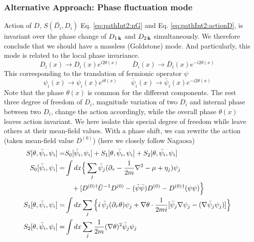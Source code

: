 \subsubsection{Alternative Approach: Phase fluctuation mode \label{sec:phaseFluctuation}}
 Action of $D$, $S(\bar{D_i},D_i)$ Eq. \eqref{eq:pathInt2:nG} and Eq. \eqref{eq:pathInt2:actionD}, is invariant over the phase change of $D_{1\,\mathbf{k}}$ and $D_{2\,\mathbf{k}}$ simultaneously. We therefore conclude that we should have a massless (Goldstone) mode.  And particularly, this mode is related to the local phase invariance. 
\begin{equation*}
D_{i}(x)\rightarrow{}D_{i}(x)e^{i2\theta(x)}\qquad{}
\bar{D}_{i}(x)\rightarrow{}\bar{D}_{i}(x)e^{-i2\theta(x)}
\end{equation*}
This corresponding to the translation of fermionic operator $\psi$
\begin{equation*}
\psi_{i}(x)\rightarrow{}\psi_{i}(x)e^{i\theta(x)}\qquad{}
\bar{\psi}_{i}(x)\rightarrow{}\bar{\psi}_{i}(x)e^{-i2\theta(x)}
\end{equation*}
Note that the phase $\theta(x)$ is common for the different components. The rest three degree of freedom of $D_i$, magnitude variation of two $D_i$ and internal phase between two $D_i$, change the action accordingly, while the overall phase $\theta(x)$ leaves action invariant.  We here isolate this special degree of freedom while leave others at their mean-field values. With a phase shift, we can rewrite the action (taken mean-field value $D^{(0)}$) (here we closely follow Nagaosa\cite{Nagaosa})
\begin{subequations}
\begin{align}\label{eq:pathInt2:actionPhase}
S[\theta,\bar\psi_{i},\psi_{i}]=&S_0[\bar\psi_{i},\psi_{i}]+S_1[\theta,\bar\psi_{i},\psi_{i}]+S_2[\theta,\bar\psi_{i},\psi_{i}]\\
S_0[\bar\psi_{i},\psi_{i}]=&\int{dx}
\Big\{\sum_{j}\bar\psi_{j}(\partial_\tau-\frac{1}{2m}\nabla^{2}-\mu+\eta_{j})\psi_{j}\nonumber\\
&\quad+[D^{(0)}{}^{\dagger}\tilde{U}^{-1}D^{(0)}-(\bar\psi\bar\psi)D^{(0)}-{D^{(0)}}{}^{\dagger}(\psi\psi)\Big\}\\
S_1[\theta,\bar\psi_{i},\psi_{i}]=&\int{dx}\sum_{j}\Big\{
   i\,\bar\psi_{j}(\partial_{\tau}\theta)\psi_{j}+\nabla\theta\cdot\frac{1}{2mi}[\bar\psi_{j}\nabla\psi_{j}-(\nabla\bar{\psi}_{j}\psi_{j})]\Big\}\\
S_2[\theta,\bar\psi_{i},\psi_{i}]=&\int{dx}\sum_{j}\frac{1}{2m}(\nabla\theta)^{2}\bar\psi_{j}\psi_{j}
\end{align}
\end{subequations}
